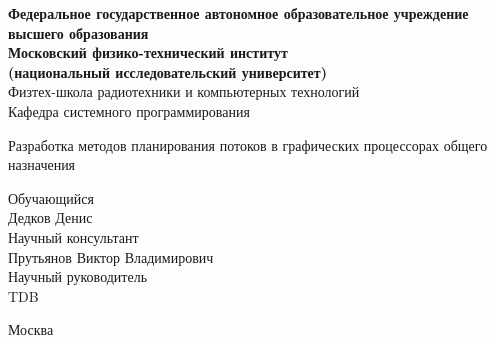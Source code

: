 \begin{titlepage}
	\begin{center}
	{\bf Федеральное государственное автономное образовательное учреждение \\
	высшего образования \\
	Московский физико-технический институт                                      \\
	(национальный исследовательский университет) \\ }
	Физтех-школа радиотехники и компьютерных технологий \\
	Кафедра системного программирования \\
	\vspace{1em}
	\end{center}
	
	\begin{center}
	\vspace{1cm}
	
	\vspace{\fill}
	
	\begin{LARGE}
	Разработка методов планирования потоков в графических процессорах общего назначения \\
	\end{LARGE}
	\vspace{1em}
	\vspace{1.5cm}
	\vspace{\fill}
	\end{center}
	
	
	\begin{flushright}
	Обучающийся\\
	Дедков Денис \\

	\vspace{2em}
	Научный консультант \\
	Прутьянов Виктор Владимирович \\

	\vspace{2em}
	Научный руководитель \\
	TDB \\

	\end{flushright}
	
	\vspace{7em}
	
	\begin{center}
	Москва
	\the\year{}
	\end{center}
\end{titlepage}

